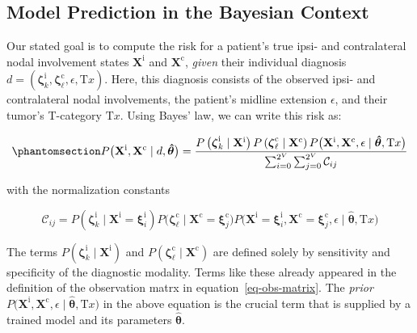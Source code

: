 \documentclass[
  sn-mathphys-num,
]{sn-jnl}
\begin{document}
\subsection{Model Prediction in the Bayesian
Context}\label{model-prediction-in-the-bayesian-context}

Our stated goal is to compute the risk for a patient's true ipsi- and
contralateral nodal involvement states \(\mathbf{X}^\text{i}\) and
\(\mathbf{X}^\text{c}\), \emph{given} their individual diagnosis
\(d = \left( \boldsymbol{\zeta}^\text{i}_k, \boldsymbol{\zeta}^\text{c}_\ell, \epsilon, \text{T}x \right)\).
Here, this diagnosis consists of the observed ipsi- and contralateral
nodal involvements, the patient's midline extension \(\epsilon\), and
their tumor's T-category \(\text{T}x\). Using Bayes' law, we can write
this risk as:

\begin{equation}\phantomsection\label{eq-uni-bayes-law}{
P \big( \mathbf{X}^\text{i}, \mathbf{X}^\text{c} \mid d, \boldsymbol{\hat{\theta}} \big)
= \frac{P \left( \boldsymbol{\zeta}^\text{i}_k \mid \mathbf{X}^\text{i} \right) P \left( \boldsymbol{\zeta}^\text{c}_\ell \mid \mathbf{X}^\text{c} \right) P \big( \mathbf{X}^\text{i}, \mathbf{X}^\text{c}, \epsilon \mid \boldsymbol{\hat{\theta}}, \text{T}x \big)}
{\sum_{i=0}^{2^V} \sum_{j=0}^{2^V} \mathcal{C}_{ij}}
}\end{equation}

with the normalization constants

\[
\mathcal{C}_{ij} = P \left( \boldsymbol{\zeta}^\text{i}_k \mid \mathbf{X}^\text{i}=\boldsymbol{\xi}^\text{i}_i \right) P \big( \boldsymbol{\zeta}^\text{c}_\ell \mid \mathbf{X}^\text{c}=\boldsymbol{\xi}^\text{c}_j \big) P \big( \mathbf{X}^\text{i}=\boldsymbol{\xi}^\text{i}_i, \mathbf{X}^\text{c}=\boldsymbol{\xi}^\text{c}_j, \epsilon \mid \boldsymbol{\hat{\theta}}, \text{T}x \big)
\]

The terms
\(P \left( \boldsymbol{\zeta}^\text{i}_k \mid \mathbf{X}^\text{i} \right)\)
and
\(P \left( \boldsymbol{\zeta}^\text{c}_\ell \mid \mathbf{X}^\text{c} \right)\)
are defined solely by sensitivity and specificity of the diagnostic
modality. Terms like these already appeared in the definition of the
observation matrx in equation~\ref{eq-obs-matrix}. The \emph{prior}
\(P \big( \mathbf{X}^\text{i}, \mathbf{X}^\text{c}, \epsilon \mid \boldsymbol{\hat{\theta}}, \text{T}x \big)\)
in the above equation is the crucial term that is supplied by a trained
model and its parameters \(\boldsymbol{\hat{\theta}}\).
\end{document}
